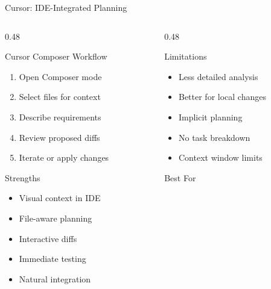 \documentclass[aspectratio=169,10pt]{beamer}
\begin{document}
\begin{frame}{Cursor: IDE-Integrated Planning}
    \begin{columns}[T]
        \begin{column}{0.48\textwidth}
            \begin{block}{Cursor Composer Workflow}
                \begin{enumerate}
                    \item Open Composer mode
                    \item Select files for context
                    \item Describe requirements
                    \item Review proposed diffs
                    \item Iterate or apply changes
                \end{enumerate}
            \end{block}
            \begin{exampleblock}{Strengths}
                \begin{itemize}
                    \item Visual context in IDE
                    \item File-aware planning
                    \item Interactive diffs
                    \item Immediate testing
                    \item Natural integration
                \end{itemize}
            \end{exampleblock}
        \end{column}
        \begin{column}{0.48\textwidth}
            \begin{alertblock}{Limitations}
                \begin{itemize}
                    \item Less detailed analysis
                    \item Better for local changes
                    \item Implicit planning
                    \item No task breakdown
                    \item Context window limits
                \end{itemize}
            \end{alertblock}
            \begin{block}{Best For}

\end{block}
\end{column}
\end{columns}
\end{frame}
\end{document}
